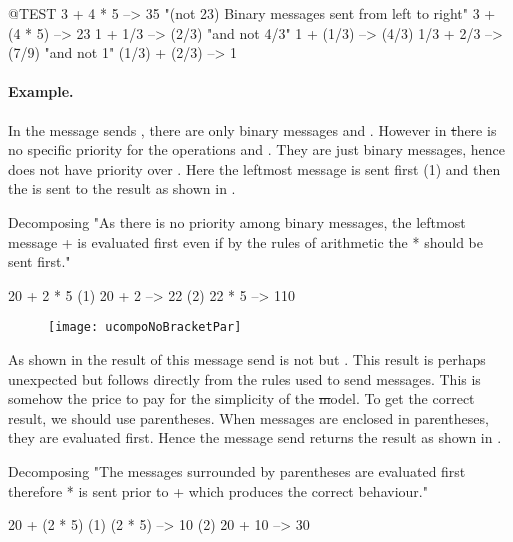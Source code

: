 \documentclass[a4paper,10pt,twoside]{book}
\begin{document}
\begin{code}{@TEST}
3 + 4 * 5      --> 35    "(not 23)  Binary messages sent from left to right"
3 + (4 * 5)    --> 23
1 + 1/3         --> (2/3)    "and not 4/3"
1 + (1/3)       --> (4/3)
1/3 + 2/3       --> (7/9)    "and not 1"
(1/3) + (2/3)  --> 1
\end{code}

\paragraph{Example.} 
In the message sends , there are only binary messages \ct{+} and \ct{*}. However in \st there is no specific priority for the operations \ct{+} and \ct{*}. They are just binary messages, hence \ct{*} does not have priority over \ct{+}. Here the leftmost message \ct{+} is sent first (1) and then the \ct{*} is sent to the result as shown in .  

\begin{example}[binaryMessages1]{Decomposing }{}
"As there is no priority among binary messages, the leftmost message + is evaluated first even if by the rules of arithmetic the * should be sent first."

      20 + 2 * 5 
(1)  20 + 2 --> 22
(2)  22       * 5 --> 110
\end{example}

\begin{figure}
\begin{center}\texttt{[image: ucompoNoBracketPar]}\end{center}
\end{figure}
\noindent
As shown in  the result of this message send is not  but . This result is perhaps unexpected but follows directly from the rules used to send messages. This is somehow the price to pay for the simplicity of the \st model. To get the correct result, we should use parentheses. When messages are enclosed in parentheses, they are evaluated first. Hence the message send  returns the result as shown in .

\begin{example}[mathcorrect]{Decomposing }{}
"The messages surrounded by parentheses are evaluated first therefore * is sent prior to + which produces the correct behaviour."

    20 + (2 * 5) 
(1)        (2 * 5) --> 10
(2) 20 + 10      --> 30
\end{example}
\end{document}
